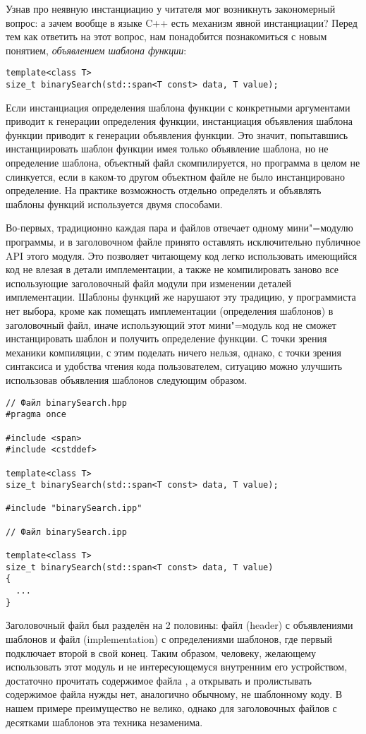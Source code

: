Узнав про неявную инстанциацию у читателя мог возникнуть закономерный вопрос: а зачем вообще в языке C++ есть механизм явной инстанциации? Перед тем как ответить на этот вопрос, нам понадобится познакомиться с новым понятием, \textit{объявлением шаблона функции}:
\begin{verbatim}
template<class T>
size_t binarySearch(std::span<T const> data, T value);
\end{verbatim}
Если инстанциация определения шаблона функции с конкретными аргументами приводит к генерации определения функции, инстанциация объявления шаблона функции приводит к генерации объявления функции.
Это значит, попытавшись инстанциировать шаблон функции имея только объявление шаблона, но не определение шаблона, объектный файл скомпилируется, но программа в целом не слинкуется, если в каком-то другом объектном файле не было инстанцировано определение.
На практике возможность отдельно определять и объявлять шаблоны функций используется двумя способами.

Во-первых, традиционно каждая пара  и  файлов отвечает одному мини"=модулю программы, и в заголовочном файле принято оставлять исключительно публичное API этого модуля.
Это позволяет читающему код легко использовать имеющийся код не влезая в детали имплементации, а также не компилировать заново все использующие заголовочный файл модули при изменении деталей имплементации.
Шаблоны функций же нарушают эту традицию, у программиста нет выбора, кроме как помещать имплементации (определения шаблонов) в заголовочный файл, иначе использующий этот мини"=модуль код не сможет инстанцировать шаблон и получить определение функции.
С точки зрения механики компиляции, с этим поделать ничего нельзя, однако, с точки зрения синтаксиса и удобства чтения кода пользователем, ситуацию можно улучшить использовав объявления шаблонов следующим образом.
\begin{verbatim}
// Файл binarySearch.hpp
#pragma once

#include <span>
#include <cstddef>

template<class T>
size_t binarySearch(std::span<T const> data, T value);

#include "binarySearch.ipp"

// Файл binarySearch.ipp

template<class T>
size_t binarySearch(std::span<T const> data, T value)
{
  ...
}
\end{verbatim}
Заголовочный файл был разделён на 2 половины: файл  (header) с объявлениями шаблонов и файл  (implementation) с определениями шаблонов, где первый подключает второй в свой конец.
Таким образом, человеку, желающему использовать этот модуль и не интересующемуся внутренним его устройством, достаточно прочитать содержимое файла , а открывать и пролистывать содержимое файла  нужды нет, аналогично обычному, не шаблонному коду.
В нашем примере преимущество не велико, однако для заголовочных файлов с десятками шаблонов эта техника незаменима.

